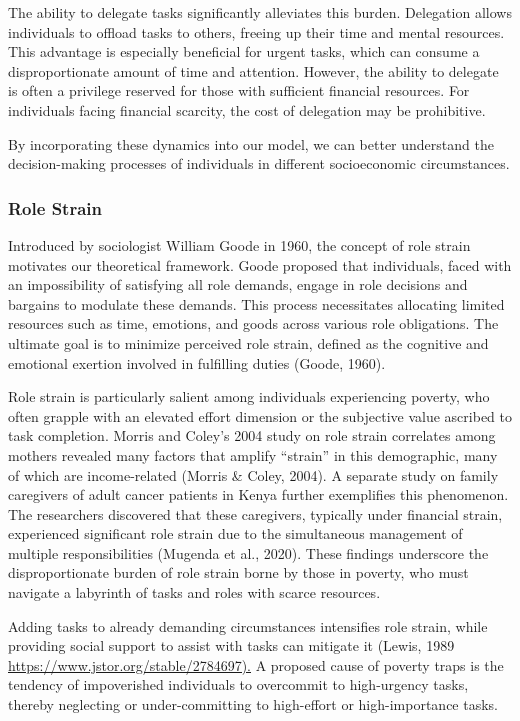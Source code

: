 \documentclass[
]{article}
\begin{document}
The ability to delegate tasks significantly alleviates this burden.
Delegation allows individuals to offload tasks to others, freeing up
their time and mental resources. This advantage is especially beneficial
for urgent tasks, which can consume a disproportionate amount of time
and attention. However, the ability to delegate is often a privilege
reserved for those with sufficient financial resources. For individuals
facing financial scarcity, the cost of delegation may be prohibitive.

By incorporating these dynamics into our model, we can better understand
the decision-making processes of individuals in different socioeconomic
circumstances.

\hypertarget{role-strain}{%
\subsubsection{Role Strain}\label{role-strain}}

Introduced by sociologist William Goode in 1960, the concept of role
strain motivates our theoretical framework. Goode proposed that
individuals, faced with an impossibility of satisfying all role demands,
engage in role decisions and bargains to modulate these demands. This
process necessitates allocating limited resources such as time,
emotions, and goods across various role obligations. The ultimate goal
is to minimize perceived role strain, defined as the cognitive and
emotional exertion involved in fulfilling duties (Goode, 1960).

Role strain is particularly salient among individuals experiencing
poverty, who often grapple with an elevated effort dimension or the
subjective value ascribed to task completion. Morris and Coley's 2004
study on role strain correlates among mothers revealed many factors that
amplify ``strain'' in this demographic, many of which are income-related
(Morris \& Coley, 2004). A separate study on family caregivers of adult
cancer patients in Kenya further exemplifies this phenomenon. The
researchers discovered that these caregivers, typically under financial
strain, experienced significant role strain due to the simultaneous
management of multiple responsibilities (Mugenda et al., 2020). These
findings underscore the disproportionate burden of role strain borne by
those in poverty, who must navigate a labyrinth of tasks and roles with
scarce resources.

Adding tasks to already demanding circumstances intensifies role strain,
while providing social support to assist with tasks can mitigate it
(Lewis, 1989 \url{https://www.jstor.org/stable/2784697).} A proposed
cause of poverty traps is the tendency of impoverished individuals to
overcommit to high-urgency tasks, thereby neglecting or under-committing
to high-effort or high-importance tasks.
\end{document}
